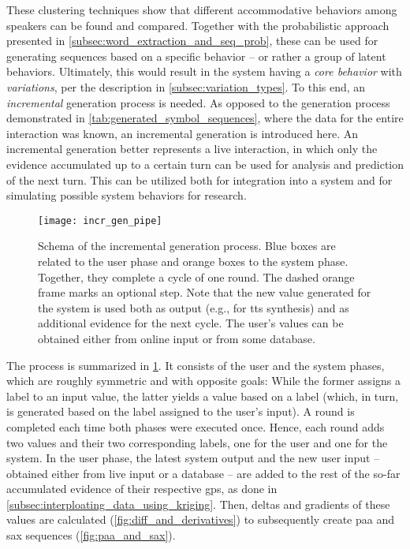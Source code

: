These clustering techniques show that different accommodative behaviors among speakers can be found and compared.
Together with the probabilistic approach presented in \cref{subsec:word_extraction_and_seq_prob}, these can be used for generating sequences based on a specific behavior -- or rather a group of latent behaviors.
Ultimately, this would result in the system having a \emph{core behavior} with \emph{variations}, per the description in \cref{subsec:variation_types}.
To this end, an \emph{incremental} generation process is needed.
As opposed to the generation process demonstrated in \cref{tab:generated_symbol_sequences}, where the data for the entire interaction was known, an incremental generation is introduced here.
An incremental generation better represents a live interaction, in which only the evidence accumulated up to a certain turn can be used for analysis and prediction of the next turn.
This can be utilized both for integration into a system and for simulating possible system behaviors for research.
%
\begin{figure}[t]
	\centering
	\texttt{[image: incr\_gen\_pipe]}
	\caption[Incremental generation process]
		{Schema of the incremental generation process.
		 Blue boxes are related to the user phase and orange boxes to the system phase.
		 Together, they complete a cycle of one round.
		 The dashed orange frame marks an optional step.
		 Note that the new value generated for the system is used both as output (e.g., for \ac{tts} synthesis) and as additional evidence for the next cycle.
		 The user's values can be obtained either from online input or from some database.}
	\label{fig:incr_gen_pipe}
\end{figure}
%
The process is summarized in \cref{fig:incr_gen_pipe}.
It consists of the user and the system phases, which are roughly symmetric and with opposite goals:
While the former assigns a label to an input value, the latter yields a value based on a label (which, in turn, is generated based on the label assigned to the user's input).
A round is completed each time both phases were executed once.
Hence, each round adds two values and their two corresponding labels, one for the user and one for the system.
In the user phase, the latest system output and the new user input -- obtained either from live input or a database -- are added to the rest of the so-far accumulated evidence of their respective \acp{gp}, as done in \cref{subsec:interploating_data_using_kriging}.
Then, deltas and gradients of these values are calculated (\cref{fig:diff_and_derivatives}) to subsequently create \ac{paa} and \ac{sax} sequences (\cref{fig:paa_and_sax}).
